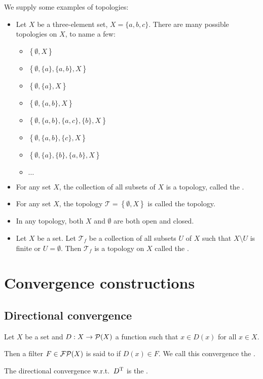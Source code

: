 \begin{example}
We supply some examples of topologies:
\begin{itemize}
\item Let $X$ be a three-element set, $X = \{a,b,c\}$. There are many possible topologies on $X$, to name a few:
\begin{itemize}
\item $\left\{\emptyset, X\right\}$
\item $\left\{\emptyset, \{a\}, \{a,b\}, X\right\}$
\item $\left\{\emptyset, \{a\}, X\right\}$
\item $\left\{\emptyset, \{a,b\}, X\right\}$
\item $\left\{\emptyset, \{a,b\}, \{a,c\}, \{b\}, X\right\}$
\item $\left\{\emptyset, \{a,b\}, \{c\}, X\right\}$
\item $\left\{\emptyset, \{a\}, \{b\}, \{a,b\}, X\right\}$
\item $\ldots$
\end{itemize}
\item For any set $X$, the collection of all subsets of $X$ is a topology, called the .
\item For any set $X$, the topology $\mathcal{T} = \left\{\emptyset, X\right\}$ is called the  topology.
\item In any topology, both $X$ and $\emptyset$ are both open and closed.
\item Let $X$ be a set. Let $\mathcal{T}_f$ be a collection of all subsets $U$ of $X$ such that $X\setminus U$ is finite or $U=\emptyset$. Then $\mathcal{T}_f$ is a topology on $X$ called the .
\end{itemize}
\end{example}

\section{Convergence constructions}
\subsection{Directional convergence}
\begin{definition}
Let $X$ be a set and $D: X\to \operatorname{\mathcal{P}}(X)$ a function such that $x\in D(x)$ for all $x\in X$.

Then a filter $F\in \operatorname{\mathcal{FP}}(X)$ is said to  if $D(x)\in F$. We call this convergence the .

The directional convergence w.r.t.\ $D^{\mathrm{T}}$ is the .
\end{definition}

